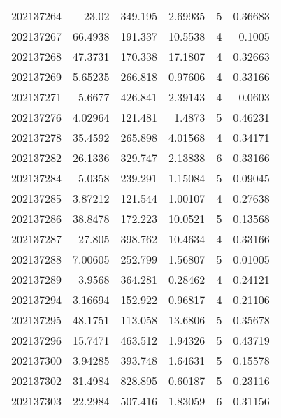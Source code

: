 \begin{tabular}{rrrrrr}
 202137264 &         23.02    &      349.195  &            2.69935 &           5 & 0.36683 \\
 202137267 &         66.4938  &      191.337  &           10.5538  &           4 & 0.1005  \\
 202137268 &         47.3731  &      170.338  &           17.1807  &           4 & 0.32663 \\
 202137269 &          5.65235 &      266.818  &            0.97606 &           4 & 0.33166 \\
 202137271 &          5.6677  &      426.841  &            2.39143 &           4 & 0.0603  \\
 202137276 &          4.02964 &      121.481  &            1.4873  &           5 & 0.46231 \\
 202137278 &         35.4592  &      265.898  &            4.01568 &           4 & 0.34171 \\
 202137282 &         26.1336  &      329.747  &            2.13838 &           6 & 0.33166 \\
 202137284 &          5.0358  &      239.291  &            1.15084 &           5 & 0.09045 \\
 202137285 &          3.87212 &      121.544  &            1.00107 &           4 & 0.27638 \\
 202137286 &         38.8478  &      172.223  &           10.0521  &           5 & 0.13568 \\
 202137287 &         27.805   &      398.762  &           10.4634  &           4 & 0.33166 \\
 202137288 &          7.00605 &      252.799  &            1.56807 &           5 & 0.01005 \\
 202137289 &          3.9568  &      364.281  &            0.28462 &           4 & 0.24121 \\
 202137294 &          3.16694 &      152.922  &            0.96817 &           4 & 0.21106 \\
 202137295 &         48.1751  &      113.058  &           13.6806  &           5 & 0.35678 \\
 202137296 &         15.7471  &      463.512  &            1.94326 &           5 & 0.43719 \\
 202137300 &          3.94285 &      393.748  &            1.64631 &           5 & 0.15578 \\
 202137302 &         31.4984  &      828.895  &            0.60187 &           5 & 0.23116 \\
 202137303 &         22.2984  &      507.416  &            1.83059 &           6 & 0.31156 \\

\end{tabular}
